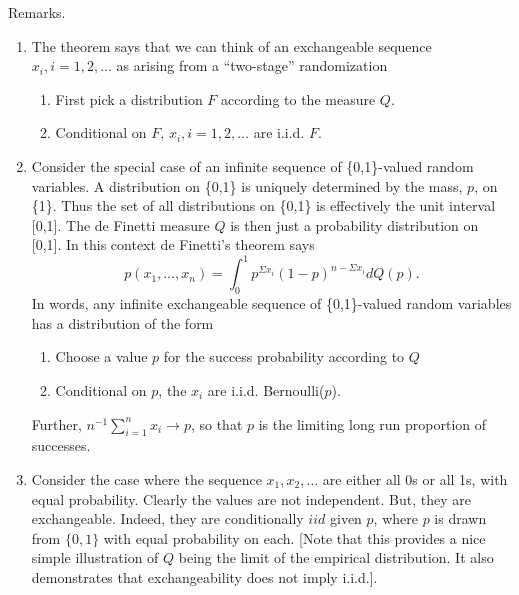 \documentclass{article}
\begin{document}
\vskip 4mm
\noindent Remarks.
\begin{enumerate}
\item  The theorem says that we
  can think of an exchangeable sequence $x_i,i=1,2,\ldots$ as arising
from a ``two-stage'' randomization
  \begin{enumerate}
    \item First pick a distribution $F$ according to the measure $Q$.
    \item Conditional on $F$, $x_i,i=1,2,\ldots$ are i.i.d. $F$.
  \end{enumerate}
\item Consider the special case of an infinite sequence of \{0,1\}-valued
random variables.  A distribution on \{0,1\} is uniquely
  determined by the mass, $p$, on \{1\}.  Thus the set of all
  distributions on \{0,1\} is effectively the unit interval [0,1].  The
  de Finetti measure $Q$ is then just a probability distribution on [0,1].
In this context de Finetti's theorem says 
$$p(x_1,\ldots,x_n)=\int_0^1 p^{\Sigma x_i} (1-p)^{n-\Sigma x_i}
dQ(p).$$
In words, any infinite exchangeable sequence of \{0,1\}-valued random
variables has a distribution of the form
\begin{enumerate}
\item Choose a value $p$ for the success probability according to $Q$
\item Conditional on $p$, the $x_i$ are i.i.d. Bernoulli($p$).
\end{enumerate}
Further, $n^{-1} \sum_{i=1}^n x_i \to p$, so that $p$ is the
limiting long run proportion of successes.
\vskip 4mm

\item Consider the case where the sequence $x_1,x_2,\dots$ are either all 0s or all 1s, with equal probability. Clearly the values are not independent. But, they are exchangeable. Indeed, they are conditionally $iid$ given $p$, where $p$ is drawn from $\{0,1\}$ with
equal probability on each. [Note that this provides a nice simple illustration of $Q$ being the limit of the empirical distribution. It also demonstrates
that exchangeability does not imply i.i.d.].


\end{enumerate}
\end{document}
